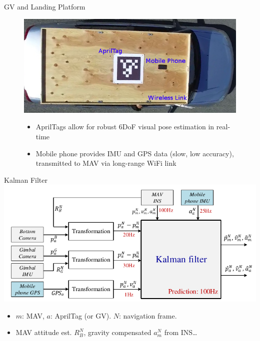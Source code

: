 \begin{frame}{GV and Landing Platform}
	\begin{figure}
		\includegraphics[width=0.8\paperwidth]{figures/car.png}
		\begin{itemize}
			\item	AprilTags allow for robust 6DoF visual pose estimation in real-time %
			\item Mobile phone provides IMU and GPS data (slow, low accuracy), transmitted to MAV via long-range WiFi link
		\end{itemize}
	\end{figure}
\end{frame}


\begin{frame}{Kalman Filter}
		\includegraphics[width=0.85\paperwidth]{figures/kf.pdf}\\
		\begin{itemize}
			\item $m$: MAV, $a$: AprilTag (or GV). $N$: navigation frame.
			\item	MAV attitude est. $R^N_B$, gravity compensated $a_m^N$ from INS\ldots %
		\end{itemize}
\end{frame}

